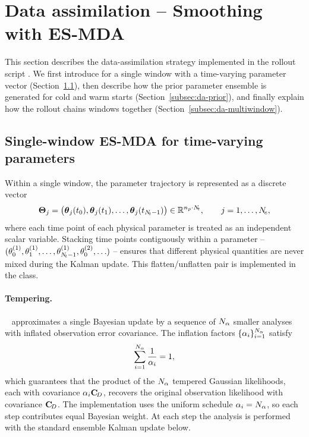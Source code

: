 \section{Data assimilation -- Smoothing with ES-MDA}
\label{sec:da}

This section describes the data-assimilation strategy implemented in
the rollout script \rolloutscript{}.
We first introduce \ESMDA{} for a single window with a time-varying
parameter vector (Section~\ref{subsec:da-single-window}), then
describe how the prior parameter ensemble is generated for cold and
warm starts (Section~\ref{subsec:da-prior}), and finally explain
how the rollout chains windows together
(Section~\ref{subsec:da-multiwindow}).

\subsection{Single-window ES-MDA for time-varying parameters}
\label{subsec:da-single-window}

Within a single window, the parameter trajectory is represented as a
discrete vector
\begin{equation}
  \boldsymbol{\Theta}_j = \bigl(\boldsymbol{\theta}_j(t_0), \boldsymbol{\theta}_j(t_1), \ldots, \boldsymbol{\theta}_j(t_{N_{\!t}-1})\bigr)
  \in \mathbb{R}^{n_p \cdot N_{\!t}}, \qquad j = 1, \ldots, N_{\!e},
  \label{eq:flat-param}
\end{equation}
where each time point of each physical parameter is treated as an
independent scalar variable.  Stacking time points contiguously
within a parameter -- $(\theta^{(1)}_0, \theta^{(1)}_1, \ldots,
\theta^{(1)}_{N_{\!t}-1}, \theta^{(2)}_0, \ldots)$ -- ensures that
different physical quantities are never mixed during the Kalman
update.  This flatten/unflatten pair is implemented in the
\tvESMDAclass{} class.

\paragraph{Tempering.}
\ESMDA{}~\cite{emerick2013esmda} approximates a single Bayesian
update by a sequence of $N_{\alpha}$ smaller analyses with inflated
observation error covariance.  The inflation factors
$\{\alpha_i\}_{i=1}^{N_{\alpha}}$ satisfy
\begin{equation}
  \sum_{i=1}^{N_{\alpha}} \frac{1}{\alpha_i} = 1,
  \label{eq:esmda-tempering}
\end{equation}
which guarantees that the product of the $N_{\alpha}$ tempered
Gaussian likelihoods, each with covariance $\alpha_i \mathbf{C}_{\!D}$,
recovers the original observation likelihood with covariance $\mathbf{C}_{\!D}$.
The implementation uses the uniform schedule $\alpha_i =
N_{\alpha}$, so each step contributes equal Bayesian weight.  At each
step the analysis is performed with the standard ensemble Kalman
update below.

